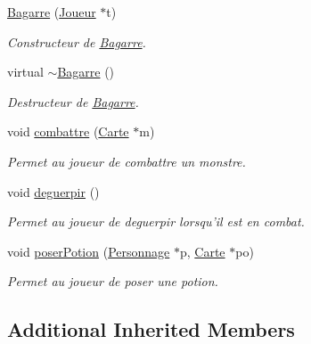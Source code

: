 \begin{DoxyCompactItemize}
\item 
\hyperlink{class_bagarre_acb7416e18dc7f862d416ccaf97c7e3e2}{Bagarre} (\hyperlink{class_joueur}{Joueur} $\ast$t)
\begin{DoxyCompactList}\small\item\em Constructeur de \hyperlink{class_bagarre}{Bagarre}. \end{DoxyCompactList}\item 
\hypertarget{class_bagarre_a4b37f229dd2b741cbfda7181e267b4f0}{virtual \hyperlink{class_bagarre_a4b37f229dd2b741cbfda7181e267b4f0}{$\sim$\-Bagarre} ()}\label{class_bagarre_a4b37f229dd2b741cbfda7181e267b4f0}

\begin{DoxyCompactList}\small\item\em Destructeur de \hyperlink{class_bagarre}{Bagarre}. \end{DoxyCompactList}\item 
void \hyperlink{class_bagarre_a084f695d366ea866270c2e8c5561c8fe}{combattre} (\hyperlink{class_carte}{Carte} $\ast$m)
\begin{DoxyCompactList}\small\item\em Permet au joueur de combattre un monstre. \end{DoxyCompactList}\item 
\hypertarget{class_bagarre_aae798fa4ff9eaaf30413f387302b1e3e}{void \hyperlink{class_bagarre_aae798fa4ff9eaaf30413f387302b1e3e}{deguerpir} ()}\label{class_bagarre_aae798fa4ff9eaaf30413f387302b1e3e}

\begin{DoxyCompactList}\small\item\em Permet au joueur de deguerpir lorsqu'il est en combat. \end{DoxyCompactList}\item 
void \hyperlink{class_bagarre_ae0a87f0398857acbabb9993886e96a82}{poser\-Potion} (\hyperlink{class_personnage}{Personnage} $\ast$p, \hyperlink{class_carte}{Carte} $\ast$po)
\begin{DoxyCompactList}\small\item\em Permet au joueur de poser une potion. \end{DoxyCompactList}\end{DoxyCompactItemize}
\subsection*{Additional Inherited Members}


